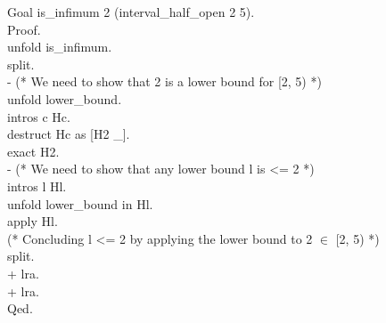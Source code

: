 \begin{leancode}
%
%
%
%
%
Goal is\_infimum 2 (interval\_half\_open 2 5).                                  \\
Proof.                                                                          \\
\tab unfold is\_infimum.                                                        \\
\tab split.                                                                     \\
\tab - (* We need to show that 2 is a lower bound for [2, 5) *)                 \\
\tab \tab unfold lower\_bound.                                                  \\
\tab \tab intros c Hc.                                                          \\
\tab \tab destruct Hc as [H2 \_].                                               \\
\tab \tab exact H2.                                                             \\
\tab - (* We need to show that any lower bound l is <= 2 *)                     \\
\tab \tab intros l Hl.                                                          \\
\tab \tab unfold lower\_bound in Hl.                                            \\
\tab \tab apply Hl.                                                             \\
\tab \tab (* Concluding l <= 2 by applying the lower bound to 2 $\in$ [2, 5) *) \\
\tab \tab split.                                                                \\
\tab \tab + lra.                                                                \\
\tab \tab + lra.                                                                \\
Qed.                                                                            \\
\end{leancode}
